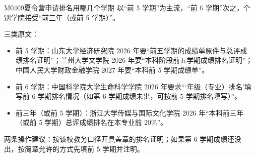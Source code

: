 \begin{qa}{M0409}{夏令营申请排名用哪几个学期}
以“前 5 学期”为主流，“前 6 学期”次之，个别学院接受“前三年（或前 5 学期）”。

三类原文：
\begin{itemize}
  \item 前 5 学期：山东大学经济研究院 2026 年要“前五学期的成绩单原件与总评成绩排名证明”；兰州大学文学院 2026 年要“本科阶段前五学期成绩排名证明”；中国人民大学财政金融学院 2027 年要“本科前 5 学期成绩单”。
  \item 前 6 学期：中国科学院大学生命科学学院 2026 年要求“‘年级（专业）排名’填写前 6 学期排名情况（如第 6 学期成绩未出，可按前 5 学期排名填写）”。
  \item 前三年（或前 5 学期）：浙江大学传媒与国际文化学院 2026 年“本科前三年（或前 5 学期）总评成绩排名在本专业前 20\%”。
\end{itemize}

两条操作建议：按该校教务口径开具盖章的排名证明；如果第 6 学期成绩还没出，按简章允许的方式先填前 5 学期并注明。
\end{qa}

